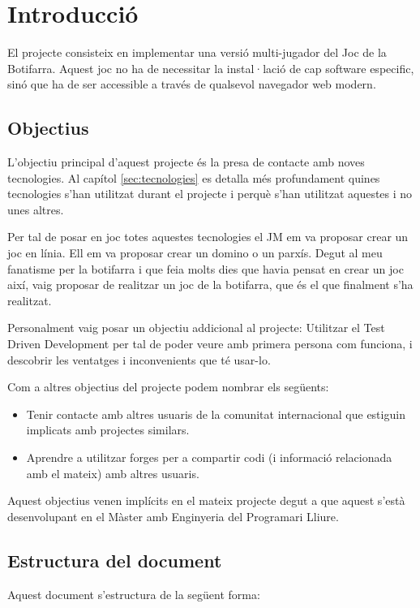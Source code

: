 \chapter{Introducció}

El projecte consisteix en implementar una versió multi-jugador del Joc de la Botifarra. Aquest joc no ha de necessitar la instal·lació de cap software especific, sinó que ha de ser accessible a través de qualsevol navegador web modern.

\section{Objectius}
L'objectiu principal d'aquest projecte és la presa de contacte amb noves tecnologies. Al capítol \ref{sec:tecnologies} es detalla més profundament quines tecnologies s'han utilitzat durant el projecte i perquè s'han utilitzat aquestes i no unes altres. 

Per tal de posar en joc totes aquestes tecnologies el JM em va proposar crear un joc en línia. Ell em va proposar crear un domino o un parxís. Degut al meu fanatisme per la botifarra i que feia molts dies que havia pensat en crear un joc així, vaig proposar de realitzar un joc de la botifarra, que és el que finalment s'ha realitzat. 

Personalment vaig posar un objectiu addicional al projecte: Utilitzar el Test Driven Development per tal de poder veure amb primera persona com funciona, i descobrir les ventatges i inconvenients que té usar-lo. 

Com a altres objectius del projecte podem nombrar els següents: 
\begin{itemize}
	\item{Tenir contacte amb altres usuaris de la comunitat internacional que estiguin implicats amb projectes similars.}
	\item{Aprendre a utilitzar forges per a compartir codi (i informació relacionada amb el mateix) amb altres usuaris.}
\end{itemize} 

Aquest objectius venen implícits en el mateix projecte degut a que aquest s'està desenvolupant en el Màster amb Enginyeria del Programari Lliure. 

\section{Estructura del document}

Aquest document s'estructura de la següent forma: 

